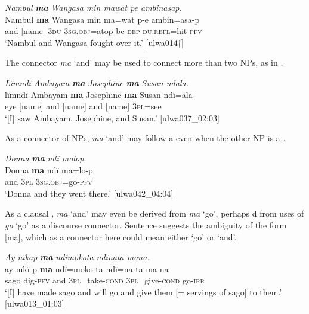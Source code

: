 \ea%
    \label{ex:complex:39}
          \textit{Nambul} \textbf{\textit{ma}} \textit{Wangasa min mawat pe ambinasap.}\\
\gll    Nambul  \textbf{ma}  Wangasa  min  ma=wat    p-e     ambin=asa-p\\
    [name]    and  [name]    \textsc{3du}  \textsc{3sg.obj=}atop  be\textsc{{}-dep}    \textsc{du.refl=}hit-\textsc{pfv}\\
\glt `Nambul and Wangasa fought over it.’ [ulwa014†]
\z

The connector \textit{ma} ‘and’ may be used to connect more than two  NPs, as in .

\ea%
    \label{ex:complex:40}
          \textit{Lïmndï Ambayam} \textbf{\textit{ma}} \textit{Josephine} \textbf{\textit{ma}} \textit{Susan ndala.}\\
\gll    lïmndï  Ambayam  \textbf{ma}  Josephine  \textbf{ma}  Susan  ndï=ala\\
    eye    [name]    and  [name]    and  [name]  3\textsc{pl}=see\\
\glt `[I] saw Ambayam, Josephine, and Susan.’ [ulwa037\_02:03]
\z

As a connector of NPs, \textit{ma} ‘and’ may follow a  even when the other NP is a  .

\ea%
    \label{ex:complex:41}
          \textit{Donna} \textbf{\textit{ma}} \textit{ndï molop.}\\
\gll    Donna  \textbf{ma}  ndï  ma=lo-p\\
    [name]  and  3\textsc{pl}  3\textsc{sg.obj}=go-\textsc{pfv}\\
\glt `Donna and they went there.’ [ulwa042\_04:04]
\z

As a clausal , \textit{ma} ‘and’ may even be derived from \textit{ma} ‘go’, perhaps d from  uses of \textit{go} ‘go’ as a discourse connector. Sentence  suggests the ambiguity of the form [ma], which as a connector here could mean either ‘go’ or ‘and’.


\ea%
    \label{ex:complex:42}
          \textit{Ay nïkap} \textbf{\textit{ma}} \textit{ndïmokota ndïnata mana.}\\
\gll    ay    nïkï-p    \textbf{ma}  ndï=moko-ta    ndï=na-ta      ma-na\\
    sago  dig{}-\textsc{pfv}  and  3\textsc{pl}=take\textsc{{}-cond}  \textsc{3pl=}give-\textsc{cond}  go-\textsc{irr}\\
\glt `[I] have made sago and will go and give them [= servings of sago] to them.’ [ulwa013\_01:03]
\z

